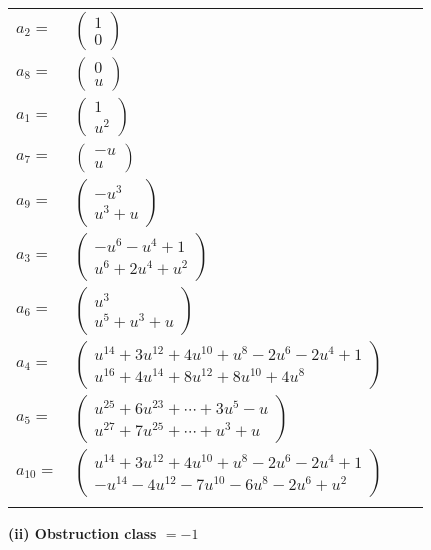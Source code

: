 \documentclass[1p]{elsarticle_modified}
\theoremstyle{definition}
\begin{document}
\begin{tabular}{m{7pt} m{180pt} m{7pt} m{180pt} }
\flushright $a_{2}=$&$\begin{pmatrix}1\\0\end{pmatrix}$ \\
\flushright $a_{8}=$&$\begin{pmatrix}0\\u\end{pmatrix}$ \\
\flushright $a_{1}=$&$\begin{pmatrix}1\\u^2\end{pmatrix}$ \\
\flushright $a_{7}=$&$\begin{pmatrix}- u\\u\end{pmatrix}$ \\
\flushright $a_{9}=$&$\begin{pmatrix}- u^3\\u^3+u\end{pmatrix}$ \\
\flushright $a_{3}=$&$\begin{pmatrix}- u^6- u^4+1\\u^6+2 u^4+u^2\end{pmatrix}$ \\
\flushright $a_{6}=$&$\begin{pmatrix}u^3\\u^5+u^3+u\end{pmatrix}$ \\
\flushright $a_{4}=$&$\begin{pmatrix}u^{14}+3 u^{12}+4 u^{10}+u^8-2 u^6-2 u^4+1\\u^{16}+4 u^{14}+8 u^{12}+8 u^{10}+4 u^8\end{pmatrix}$ \\
\flushright $a_{5}=$&$\begin{pmatrix}u^{25}+6 u^{23}+\cdots+3 u^5- u\\u^{27}+7 u^{25}+\cdots+u^3+u\end{pmatrix}$ \\
\flushright $a_{10}=$&$\begin{pmatrix}u^{14}+3 u^{12}+4 u^{10}+u^8-2 u^6-2 u^4+1\\- u^{14}-4 u^{12}-7 u^{10}-6 u^8-2 u^6+u^2\end{pmatrix}$\\&\end{tabular}
\flushleft \textbf{(ii) Obstruction class $= -1$}\\~\\
\end{document}
